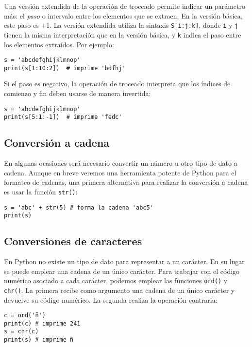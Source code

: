 Una versión extendida de la operación de troceado permite indicar un parámetro más: el \emph{paso} o intervalo entre los elementos que se extraen. En la versión básica, este paso es +1. La versión extendida utiliza la sintaxis \texttt{S[i:j:k]}, donde \texttt{i} y \texttt{j} tienen la misma interpretación que en la versión básica, y \texttt{k} indica el paso entre los elementos extraídos. Por ejemplo:

\begin{lstlisting}
s = 'abcdefghijklmnop'
print(s[1:10:2])  # imprime 'bdfhj'
\end{lstlisting} 

Si el paso es negativo, la operación de troceado interpreta que los índices de comienzo y fin deben usarse de manera invertida:

\begin{lstlisting}
s = 'abcdefghijklmnop'
print(s[5:1:-1])  # imprime 'fedc'
\end{lstlisting} 

\subsection{Conversión a cadena}

En algunas ocasiones será necesario convertir un número u otro tipo de dato a cadena. Aunque en breve veremos una herramienta potente de Python para el formateo de cadenas, una primera alternativa para realizar la conversión a cadena es usar la función \texttt{str()}:

\begin{lstlisting}
s = 'abc' + str(5) # forma la cadena 'abc5'
print(s)
\end{lstlisting}

\subsection{Conversiones de caracteres}

En Python no existe un tipo de dato para representar a un carácter. En su lugar se puede emplear una cadena de un único carácter. Para trabajar con el código numérico asociado a cada carácter, podemos emplear las funciones \texttt{ord()} y \texttt{chr()}. La primera recibe como argumento una cadena de un único carácter y devuelve su código numérico. La segunda realiza la operación contraria:

\begin{lstlisting}
c = ord('ñ')
print(c) # imprime 241 
s = chr(c)
print(s) # imprime ñ
\end{lstlisting}

